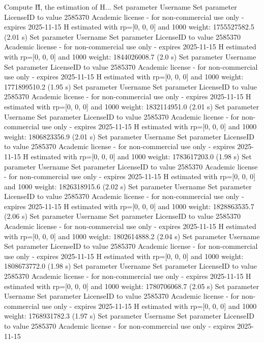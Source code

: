 Compute H̃, the estimation of H...
Set parameter Username
Set parameter LicenseID to value 2585370
Academic license - for non-commercial use only - expires 2025-11-15
  H estimated with rp=[0, 0, 0] and 1000 weight:  1755527582.5  (2.01 s)
Set parameter Username
Set parameter LicenseID to value 2585370
Academic license - for non-commercial use only - expires 2025-11-15
  H estimated with rp=[0, 0, 0] and 1000 weight:  1844026008.7  (2.0 s)
Set parameter Username
Set parameter LicenseID to value 2585370
Academic license - for non-commercial use only - expires 2025-11-15
  H estimated with rp=[0, 0, 0] and 1000 weight:  1771899510.2  (1.95 s)
Set parameter Username
Set parameter LicenseID to value 2585370
Academic license - for non-commercial use only - expires 2025-11-15
  H estimated with rp=[0, 0, 0] and 1000 weight:  1832114951.0  (2.01 s)
Set parameter Username
Set parameter LicenseID to value 2585370
Academic license - for non-commercial use only - expires 2025-11-15
  H estimated with rp=[0, 0, 0] and 1000 weight:  1806823356.9  (2.01 s)
Set parameter Username
Set parameter LicenseID to value 2585370
Academic license - for non-commercial use only - expires 2025-11-15
  H estimated with rp=[0, 0, 0] and 1000 weight:  1783617203.0  (1.98 s)
Set parameter Username
Set parameter LicenseID to value 2585370
Academic license - for non-commercial use only - expires 2025-11-15
  H estimated with rp=[0, 0, 0] and 1000 weight:  1826318915.6  (2.02 s)
Set parameter Username
Set parameter LicenseID to value 2585370
Academic license - for non-commercial use only - expires 2025-11-15
  H estimated with rp=[0, 0, 0] and 1000 weight:  1828863535.7  (2.06 s)
Set parameter Username
Set parameter LicenseID to value 2585370
Academic license - for non-commercial use only - expires 2025-11-15
  H estimated with rp=[0, 0, 0] and 1000 weight:  1802614888.2  (2.04 s)
Set parameter Username
Set parameter LicenseID to value 2585370
Academic license - for non-commercial use only - expires 2025-11-15
  H estimated with rp=[0, 0, 0] and 1000 weight:  1808673772.0  (1.98 s)
Set parameter Username
Set parameter LicenseID to value 2585370
Academic license - for non-commercial use only - expires 2025-11-15
  H estimated with rp=[0, 0, 0] and 1000 weight:  1780706068.7  (2.05 s)
Set parameter Username
Set parameter LicenseID to value 2585370
Academic license - for non-commercial use only - expires 2025-11-15
  H estimated with rp=[0, 0, 0] and 1000 weight:  1768931782.3  (1.97 s)
Set parameter Username
Set parameter LicenseID to value 2585370
Academic license - for non-commercial use only - expires 2025-11-15
